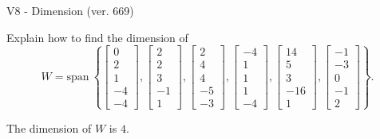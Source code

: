 \begin{exercise}
  \begin{exerciseTitle}V8 - Dimension (ver. 669)\end{exerciseTitle}
  \begin{exerciseStatement}
    Explain how to find the dimension of 
\[W=\mathrm{span}\ \left\{\left[\begin{array}{r}
0 \\
2 \\
1 \\
-4 \\
-4
\end{array}\right] , \left[\begin{array}{r}
2 \\
2 \\
3 \\
-1 \\
1
\end{array}\right] , \left[\begin{array}{r}
2 \\
4 \\
4 \\
-5 \\
-3
\end{array}\right] , \left[\begin{array}{r}
-4 \\
1 \\
1 \\
1 \\
-4
\end{array}\right] , \left[\begin{array}{r}
14 \\
5 \\
3 \\
-16 \\
1
\end{array}\right] , \left[\begin{array}{r}
-1 \\
-3 \\
0 \\
-1 \\
2
\end{array}\right]\right\}.\]



  \end{exerciseStatement}
  \begin{exerciseAnswer}
   The dimension of \(W\) is  \(4\).
  


  \end{exerciseAnswer}
\end{exercise}